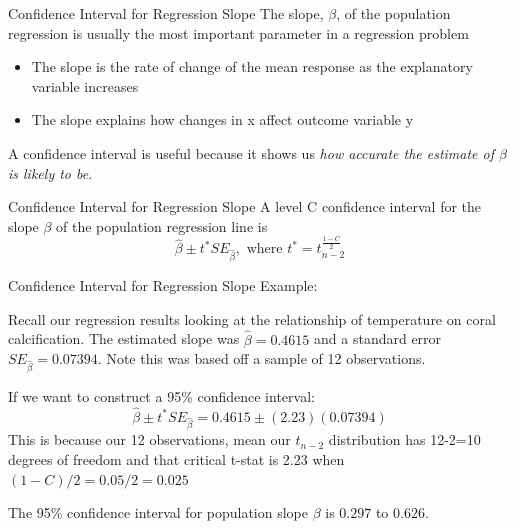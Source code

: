 \documentclass{beamer}
\begin{document}
\begin{frame}{Confidence Interval for Regression Slope}
	The slope, $\beta$, of the population regression is usually the most important parameter in a regression problem

	\begin{itemize}
		\item The slope is the rate of change of the mean response as the explanatory variable increases
		
		\item The slope explains how changes in x affect outcome variable y
	\end{itemize}
	
	A confidence interval is useful because it shows us \textit{how accurate the estimate of $\beta$ is likely to be}.
\end{frame}




\begin{frame}{Confidence Interval for Regression Slope}
	A level C confidence interval for the slope $\beta$ of the population regression line is
	\[ 
		\hat{\beta} \pm t^* SE_{\hat{\beta}}, \text{ where } t^* = t^{\frac{1-C}{2}}_{n-2}
	\]
\end{frame}




\begin{frame}{Confidence Interval for Regression Slope}
	Example:
	
	Recall our regression results looking at the relationship of temperature on coral calcification. The estimated slope was $\hat{\beta} = 0.4615$ and a standard error $SE_{\hat{\beta}} = 0.07394$. Note this was based off a sample of 12 observations.
	
	If we want to construct a 95\% confidence interval: \[
		\hat{\beta} \pm t^* SE_{\hat{\beta}}= 0.4615 \pm (2.23)(0.07394) 
	\]
	This is because our 12 observations, mean our $t_{n-2}$ distribution has 12-2=10 degrees of freedom and that critical t-stat is 2.23 when $(1-C)/2 = 0.05/2 = 0.025$
	
	The 95\% confidence interval for population slope $\beta$ is $0.297$ to $0.626$.
\end{frame}
\end{document}
